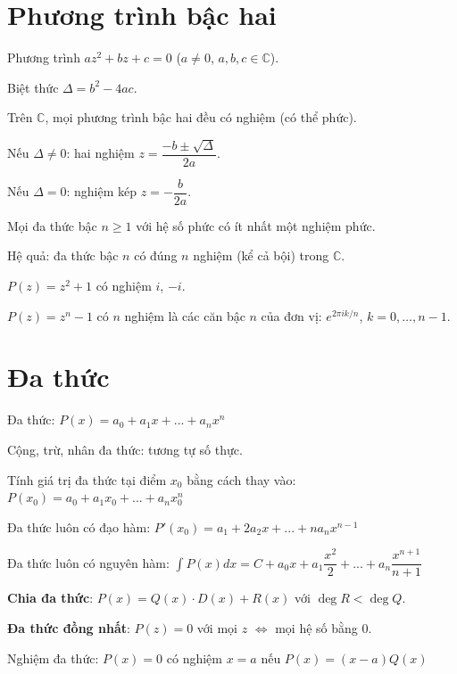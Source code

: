 \documentclass[12pt,a4paper]{article}
\begin{document}

\section{Phương trình bậc hai}

\begin{dinhnghia}
  Phương trình $az^2 + bz + c = 0$ ($a \ne 0$, $a, b, c \in \mathbb{C}$).
  
  Biệt thức $\Delta = b^2 - 4ac$.
  
  Trên $\mathbb{C}$, mọi phương trình bậc hai đều có nghiệm (có thể phức).
\end{dinhnghia}

\begin{congthuc}
  Nếu $\Delta \ne 0$: hai nghiệm $z = \dfrac{-b \pm \sqrt{\Delta}}{2a}$.
  
  Nếu $\Delta = 0$: nghiệm kép $z = -\dfrac{b}{2a}$.
\end{congthuc}

\begin{dinhly}[title={Định lý cơ bản của đại số}]
  Mọi đa thức bậc $n \ge 1$ với hệ số phức có ít nhất một nghiệm phức.
  
  Hệ quả: đa thức bậc $n$ có đúng $n$ nghiệm (kể cả bội) trong $\mathbb{C}$.
\end{dinhly}

\begin{vidu}
  $P(z) = z^2 + 1$ có nghiệm $i$, $-i$. 
  
  $P(z) = z^n - 1$ có $n$ nghiệm là các căn bậc $n$ của đơn vị: $e^{2\pi ik/n}$, $k = 0, \ldots, n-1$.
\end{vidu}


\section{Đa thức}

\begin{tinhchat}[title={Phép toán trên đa thức}]
  Đa thức: $P(x) = a_0 + a_1x + ... + a_nx^n$

  Cộng, trừ, nhân đa thức: tương tự số thực.

  Tính giá trị đa thức tại điểm $x_0$ bằng cách thay vào: $P(x_0) = a_0 + a_1x_0 + ... + a_nx_0^n$

  Đa thức luôn có đạo hàm: $P'(x_0) = a_1 + 2a_2x + ... + na_nx^{n-1}$

  Đa thức luôn có nguyên hàm: $\int P(x) dx = C +a_0x + a_1\dfrac{x^2}{2} + ... + a_n\dfrac{x^{n+1}}{n+1}$
  
  \textbf{Chia đa thức}: $P(x) = Q(x) \cdot D(x) + R(x)$ với $\deg R < \deg Q$.
  
  \textbf{Đa thức đồng nhất}: $P(z) = 0$ với mọi $z$ $\Leftrightarrow$ mọi hệ số bằng 0.

  Nghiệm đa thức: $P(x) = 0$ có nghiệm $x = a$ nếu $P(x) = (x - a)Q(x)$
\end{tinhchat}
\end{document}
